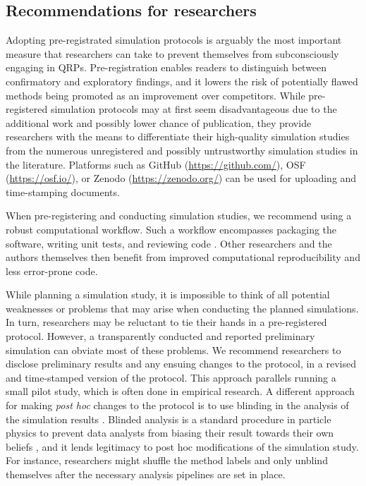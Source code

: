 \documentclass[a4paper, 11pt]{article}
\begin{document}
\subsection{Recommendations for researchers}
Adopting pre-registrated simulation protocols is arguably the most important measure 
that researchers can take to prevent themselves from subconsciously engaging in QRPs. 
Pre-registration enables readers to distinguish between confirmatory
and exploratory findings, and it lowers the risk of potentially flawed methods
being promoted as an improvement over competitors. While pre-registered
simulation protocols may at 
first seem disadvantageous due to the additional work and possibly lower chance of publication,
they provide researchers with the means to differentiate their high-quality simulation
studies from the numerous unregistered and possibly untrustworthy simulation studies
in the literature. 
Platforms such as GitHub (\url{https://github.com/}), OSF 
(\url{https://osf.io/}), or Zenodo (\url{https://zenodo.org/}) can be used for
uploading and time-stamping documents.

When pre-registering and conducting simulation studies, we recommend using a
robust computational workflow. Such a workflow encompasses packaging the software, 
writing unit tests, and reviewing code \citep[see \eg][]{schwab2021statistical}. 
Other researchers and the authors themselves then benefit from improved computational
reproducibility and less error-prone code.

While planning a simulation study, it is impossible to think of all potential 
weaknesses or problems that may arise when conducting the planned simulations. 
In turn, researchers may be reluctant to tie their hands in a pre-registered protocol.
However, a transparently conducted and reported preliminary simulation can obviate most 
of these problems. We recommend researchers to disclose preliminary results and any ensuing 
changes to the protocol, \eg in a revised and time-stamped version of the protocol.
This approach parallels running a small pilot study, which is often done in empirical 
research.
A different approach for making \emph{post hoc} changes to the protocol is to use
blinding in the analysis of the simulation results \citep{Dutilh2019}. 
Blinded analysis is a standard procedure in particle physics to prevent
data analysts from biasing their result towards their own beliefs 
\citep{Klein2005}, and it lends 
legitimacy to post hoc modifications of the simulation study.
For instance, researchers might shuffle the method labels and only unblind themselves 
after the necessary analysis pipelines are set in place. 
\end{document}
